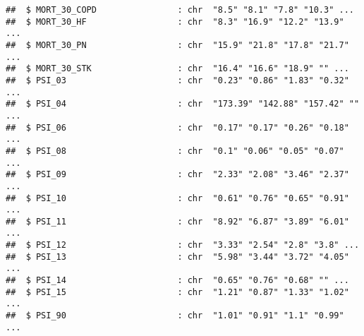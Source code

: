 \documentclass[
]{article}
\begin{document}
\begin{verbatim}
##  $ MORT_30_COPD                : chr  "8.5" "8.1" "7.8" "10.3" ...
##  $ MORT_30_HF                  : chr  "8.3" "16.9" "12.2" "13.9" ...
##  $ MORT_30_PN                  : chr  "15.9" "21.8" "17.8" "21.7" ...
##  $ MORT_30_STK                 : chr  "16.4" "16.6" "18.9" "" ...
##  $ PSI_03                      : chr  "0.23" "0.86" "1.83" "0.32" ...
##  $ PSI_04                      : chr  "173.39" "142.88" "157.42" "" ...
##  $ PSI_06                      : chr  "0.17" "0.17" "0.26" "0.18" ...
##  $ PSI_08                      : chr  "0.1" "0.06" "0.05" "0.07" ...
##  $ PSI_09                      : chr  "2.33" "2.08" "3.46" "2.37" ...
##  $ PSI_10                      : chr  "0.61" "0.76" "0.65" "0.91" ...
##  $ PSI_11                      : chr  "8.92" "6.87" "3.89" "6.01" ...
##  $ PSI_12                      : chr  "3.33" "2.54" "2.8" "3.8" ...
##  $ PSI_13                      : chr  "5.98" "3.44" "3.72" "4.05" ...
##  $ PSI_14                      : chr  "0.65" "0.76" "0.68" "" ...
##  $ PSI_15                      : chr  "1.21" "0.87" "1.33" "1.02" ...
##  $ PSI_90                      : chr  "1.01" "0.91" "1.1" "0.99" ...
\end{verbatim}
\end{document}
